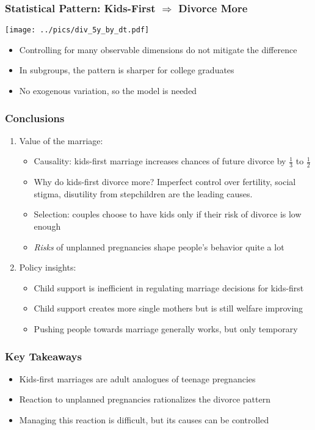 \documentclass[aspectratio=169]{beamer}
\let\olditem\item
\renewcommand{\item}{%
\olditem\vspace{\fill}}
\begin{document}
\begin{frame}
\frametitle{Statistical Pattern: Kids-First $\Rightarrow$ Divorce More}
\begin{center}
\texttt{[image: ../pics/div\_5y\_by\_dt.pdf]}
\end{center}
\begin{itemize}
\item Controlling for many observable dimensions do not mitigate the difference
\item In subgroups, the pattern is sharper for college graduates
\item No exogenous variation, so the model is needed
\end{itemize}
\end{frame}


\begin{frame}
\frametitle{Conclusions}
\begin{enumerate}
\item Value of the marriage:
\begin{itemize}
\item Causality: kids-first marriage increases chances of future divorce by $\frac13$ to $\frac12$
\item Why do kids-first divorce more? Imperfect control over fertility, social stigma, disutility from stepchildren are the leading causes.
\item Selection: couples choose to have kids only if their risk of divorce is low enough
\item \textit{Risks} of unplanned pregnancies shape people's behavior quite a lot
\end{itemize}
\item Policy insights:
\begin{itemize}
\item Child support is inefficient in regulating marriage decisions for kids-first
\item Child support creates more single mothers but is still welfare improving
\item Pushing people towards marriage generally works, but only temporary
\end{itemize}
\end{enumerate}
\end{frame}


\begin{frame}
\frametitle{Key Takeaways}
\begin{itemize}
\item Kids-first marriages are adult analogues of teenage pregnancies
\item Reaction to unplanned pregnancies rationalizes the divorce pattern
\item Managing this reaction is difficult, but its causes can be controlled
\end{itemize}
\end{frame}
\end{document}
